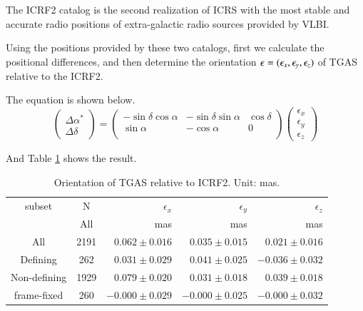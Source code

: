 \documentclass[onecolumn]{aa}   %
\begin{document}
The ICRF2 catalog is the second realization of ICRS with the most stable and accurate radio positions of extra-galactic radio sources provided by VLBI.

Using the positions provided by these two catalogs, first we calculate the positional differences, and then determine the orientation $\bold{\epsilon} = (\epsilon_x, \epsilon_y, \epsilon_z)$ of TGAS relative to the ICRF2.

The equation is shown below.
\[ 
\left( \begin{array}{c}
\Delta \alpha^* \\
\Delta \delta
\end{array} \right)
 = \left( \begin{array}{ccc}
-\sin\delta \cos\alpha & -\sin\delta \sin\alpha &  \cos\delta \\
  \sin\alpha                 & -\cos\alpha               &  0 \\
\end{array} \right)
\left( \begin{array}{c}
\epsilon_x \\
\epsilon_y \\
\epsilon_z
\end{array} \right)
\] 

And Table \ref{tab:orientation} shows the result.
\begin{table}[ht]
\caption{Orientation of TGAS relative to ICRF2. Unit: mas.}
\centering
\begin{tabular}{c c r r r }
\hline
subset		&N		&  $\epsilon_x$        	& $\epsilon_y$         	& $\epsilon_z$ \\
			&All		& mas			& mas			& mas   \\
\hline
All			&2191	&$ 0.062 \pm 0.016$    &$ 0.035 \pm 0.015$    &$ 0.021 \pm 0.016$ \\
Defining		&262		&$ 0.031 \pm 0.029$    &$ 0.041 \pm 0.025$    &$-0.036 \pm 0.032$ \\
Non-defining	&1929	&$ 0.079 \pm 0.020$    &$ 0.031 \pm 0.018$    &$ 0.039 \pm 0.018$  \\
frame-fixed	&260		&$-0.000 \pm 0.029$    &$-0.000 \pm 0.025$    &$-0.000 \pm 0.032$ \\
\hline
\end{tabular}
\label{tab:orientation}
\end{table}
\end{document}
